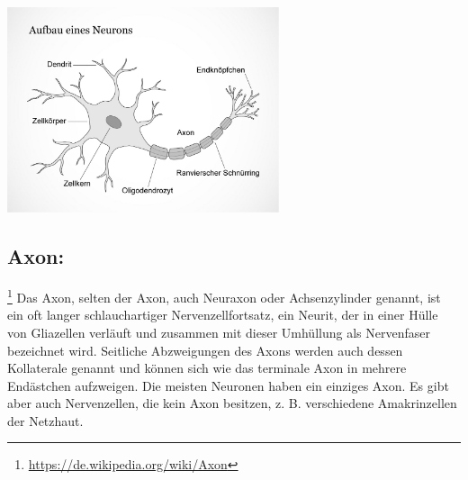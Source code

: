 \includegraphics[width=0.6\textwidth]{lectures/160405/pix/neuron.jpg}

\subsection{Axon:}\footnote{\url{https://de.wikipedia.org/wiki/Axon}} Das Axon, selten der Axon, auch Neuraxon oder Achsenzylinder genannt, ist ein oft langer schlauchartiger Nervenzellfortsatz, ein Neurit, der in einer Hülle von Gliazellen verläuft und zusammen mit dieser Umhüllung als Nervenfaser bezeichnet wird. Seitliche Abzweigungen des Axons werden auch dessen Kollaterale genannt und können sich wie das terminale Axon in mehrere Endästchen aufzweigen. Die meisten Neuronen haben ein einziges Axon. Es gibt aber auch Nervenzellen, die kein Axon besitzen, z. B. verschiedene Amakrinzellen der Netzhaut.

